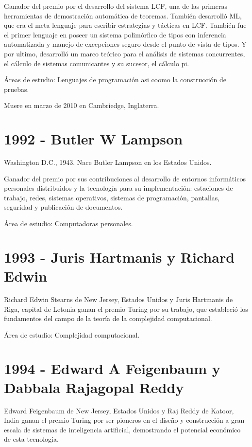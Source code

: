 \documentclass[notitlepage,letterpaper, 11pt]{article}
\begin{document}
\noindent Ganador del premio por el desarrollo del sistema LCF, una de las primeras herramientas de demostración automática de teoremas. También desarrolló ML, que era el meta lenguaje para escribir estrategias y tácticas en LCF. También fue el primer lenguaje en poseer un sistema polimórfico de tipos con inferencia automatizada y manejo de excepciones seguro desde el punto de vista de tipos.
Y por ultimo, desarrolló un marco teórico para el análisis de sistemas concurrentes, el cálculo de sistemas comunicantes y su sucesor, el cálculo pi.


\noindent Áreas de estudio: Lenguajes de programación asi coomo la construcción de pruebas.

\noindent Muere en marzo de 2010 en Cambriedge, Inglaterra.
\newline

\section*{1992 - Butler W Lampson}
\noindent Washington D.C., 1943. Nace Butler Lampson en los Estados Unidos.

\noindent Ganador del premio por sus contribuciones al desarrollo de entornos informáticos personales distribuidos y la tecnología para su implementación: estaciones de trabajo, redes, sistemas operativos, sistemas de programación, pantallas, seguridad y publicación de documentos.


\noindent Área de estudio: Computadoras personales.
\newline

\section*{1993 - Juris Hartmanis y Richard Edwin}
\noindent Richard Edwin Stearns de New Jersey, Estados Unidos y Juris Hartmanis de Riga, capital de Letonia ganan el premio Turing por su trabajo, que estableció los fundamentos del campo de la teoría de la complejidad computacional.

\noindent Área de estudio: Complejidad computacional.
\newline


\section*{1994 - Edward A Feigenbaum y Dabbala Rajagopal Reddy}
\noindent Edward Feigenbaum de New Jersey, Estados Unidos y Raj Reddy de Katoor, India ganan el premio Turing por ser pioneros en el diseño y construcción a gran escala de sistemas de inteligencia artificial, demostrando el potencial económico de esta tecnología.
\end{document}
